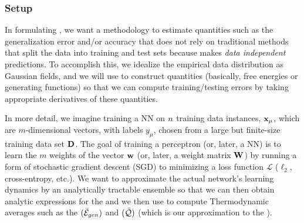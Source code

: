 \subsubsection{Setup}
\label{sxn:mathP_setup}

In formulating \SETOL, 
we want a methodology to estimate quantities such as the generalization error and/or accuracy that does not rely on traditional methods that split the data into training and test sets because \SETOL makes \emph{data independent} predictions.
To accomplish this, we idealize the empirical data distribution as Gaussian fields, and we will use \STATMECH to construct quantities (basically, free energies or generating functions) so that we can compute training/testing errors by taking appropriate derivatives of these quantities.

In more detail, we imagine training a NN on $n$ training data instances, ${\mathbf{x}}_{\mu}$, which are $m$-dimensional vectors,
with labels $y_{\mu}$, chosen from a large but finite-size training data set $\mathbf{D}$.
The goal of training a perceptron (or, later, a NN) is to learn the $m$ weights of the vector ${\mathbf{w}}$ (or, later, a weight matrix ${\mathbf{W}}$) by running a form of stochastic gradient descent (SGD) to minimizing a loss function $\mathcal{L}$ ($\ell_2$, cross-entropy, etc.). 
We want to approximate the actual network’s learning dynamics by an analytically tractable ensemble
so that we can then obtain 
analytic expressions for the \emph{\FreeEnergy} and \emph{\GeneratingFunction} we then use to compute
Thermodynamic averages such as the \emph{\AverageGeneralizationError} $(\bar{\mathcal{E}}_{gen})$ and
\emph{\ModelQuality} $(\bar{\mathcal{Q}})$ (which is our approximation to the \emph{\AverageGeneralizationAccuracy}).



